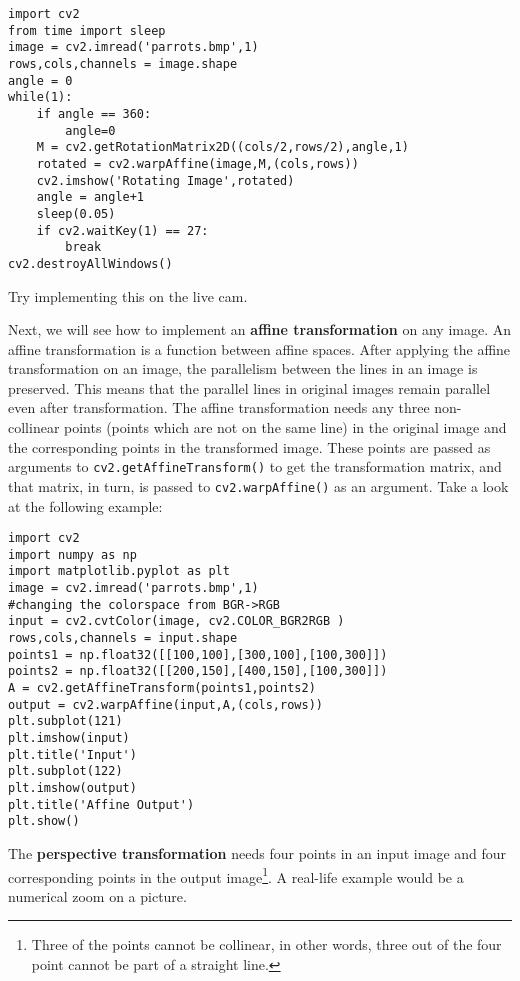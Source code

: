 \documentclass{labo}
\begin{document}
\begin{verbatim}
import cv2 
from time import sleep 
image = cv2.imread('parrots.bmp',1) 
rows,cols,channels = image.shape 
angle = 0 
while(1): 
	if angle == 360: 
		angle=0 
	M = cv2.getRotationMatrix2D((cols/2,rows/2),angle,1) 
	rotated = cv2.warpAffine(image,M,(cols,rows)) 
	cv2.imshow('Rotating Image',rotated) 
	angle = angle+1 
	sleep(0.05) 
	if cv2.waitKey(1) == 27: 
		break 
cv2.destroyAllWindows()
\end{verbatim}

\begin{leftbar}
Try implementing this on the live cam.
\end{leftbar}

Next, we will see how to implement an \textbf{affine transformation} on any image. An affine transformation is a function between affine spaces. After applying the affine transformation on an image, the parallelism between the lines in an image is preserved. This means that the parallel lines in original images remain parallel even after transformation. The affine transformation needs any three non-collinear points (points which are not on the same line) in the original image and the corresponding points in the transformed image. These points are passed as arguments to \texttt{cv2.getAffineTransform()} to get the transformation matrix, and that matrix, in turn, is passed to \texttt{cv2.warpAffine()} as an argument. Take a look at the following example:

\begin{verbatim}
import cv2 
import numpy as np 
import matplotlib.pyplot as plt 
image = cv2.imread('parrots.bmp',1) 
#changing the colorspace from BGR->RGB 
input = cv2.cvtColor(image, cv2.COLOR_BGR2RGB ) 
rows,cols,channels = input.shape 
points1 = np.float32([[100,100],[300,100],[100,300]]) 
points2 = np.float32([[200,150],[400,150],[100,300]]) 
A = cv2.getAffineTransform(points1,points2) 
output = cv2.warpAffine(input,A,(cols,rows)) 
plt.subplot(121)
plt.imshow(input)
plt.title('Input') 
plt.subplot(122)
plt.imshow(output)
plt.title('Affine Output') 
plt.show()
\end{verbatim}

The \textbf{perspective transformation} needs four points in an input image and four corresponding points in the output image\footnote{Three of the points cannot be collinear, in other words, three out of the four point cannot be part of a straight line.}. A real-life example would be a numerical zoom on a picture.\\
\end{document}
